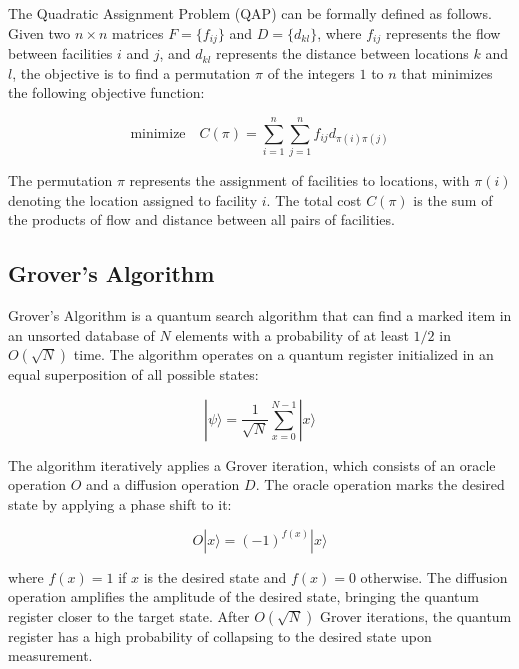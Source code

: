 The Quadratic Assignment Problem (QAP) can be formally defined as follows. Given two $n \times n$ matrices $F = \{f_{ij}\}$ and $D = \{d_{kl}\}$, where $f_{ij}$ represents the flow between facilities $i$ and $j$, and $d_{kl}$ represents the distance between locations $k$ and $l$, the objective is to find a permutation $\pi$ of the integers $1$ to $n$ that minimizes the following objective function:

\begin{equation}
    \text{minimize}\quad C(\pi) = \sum_{i=1}^n \sum_{j=1}^n f_{ij} d_{\pi(i)\pi(j)}
\end{equation}

The permutation $\pi$ represents the assignment of facilities to locations, with $\pi(i)$ denoting the location assigned to facility $i$. The total cost $C(\pi)$ is the sum of the products of flow and distance between all pairs of facilities.

\subsection{Grover's Algorithm}

Grover's Algorithm \cite{grover1996fast} is a quantum search algorithm that can find a marked item in an unsorted database of $N$ elements with a probability of at least $1/2$ in $O(\sqrt{N})$ time. The algorithm operates on a quantum register initialized in an equal superposition of all possible states:

\begin{equation}
    |\psi\rangle = \frac{1}{\sqrt{N}} \sum_{x=0}^{N-1} |x\rangle
\end{equation}

The algorithm iteratively applies a Grover iteration, which consists of an oracle operation $O$ and a diffusion operation $D$. The oracle operation marks the desired state by applying a phase shift to it:

\begin{equation}
    O|x\rangle = (-1)^{f(x)} |x\rangle
\end{equation}

where $f(x) = 1$ if $x$ is the desired state and $f(x) = 0$ otherwise. The diffusion operation amplifies the amplitude of the desired state, bringing the quantum register closer to the target state. After $O(\sqrt{N})$ Grover iterations, the quantum register has a high probability of collapsing to the desired state upon measurement.


